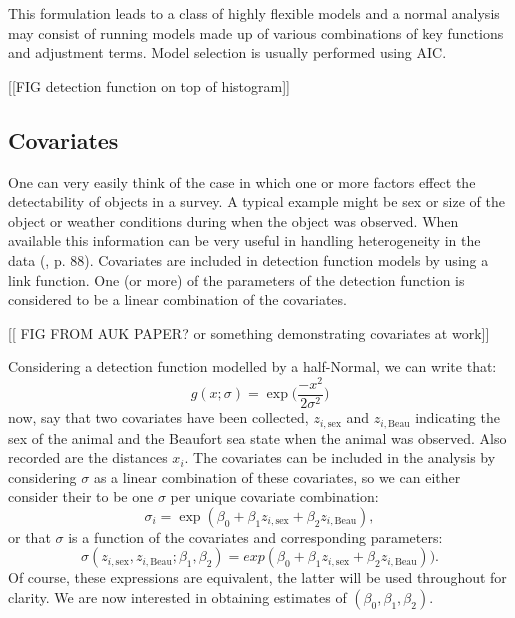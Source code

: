 This formulation leads to a class of highly flexible models and a normal analysis may consist of running models made up of various combinations of key functions and adjustment terms. Model selection is usually performed using AIC.

[[FIG detection function on top of histogram]]

\subsection{Covariates}
One can very easily think of the case in which one or more factors effect the detectability of objects in a survey. A typical example might be sex or size of the object or weather conditions during when the object was observed. When available this information can be very useful in handling heterogeneity in the data (\cite{IDS}, p. 88). Covariates are included in detection function models by using a link function. One (or more) of the parameters of the detection function is considered to be a linear combination of the covariates.

[[ FIG FROM AUK PAPER? or something demonstrating covariates at work]]

Considering a detection function modelled by a half-Normal, we can write that:
\begin{equation}
g(x; \sigma) = \exp\Big(\frac{-x^2}{2\sigma^2}\Big)
\end{equation}
now, say that two covariates have been collected, $z_{i,\text{sex}}$ and $z_{i,\text{Beau}}$ indicating the sex of the animal and the Beaufort sea state when the animal was observed. Also recorded are the distances $x_i$. The covariates can be included in the analysis by considering $\sigma$ as a linear combination of these covariates, so we can either consider their to be one $\sigma$ per unique covariate combination:
\begin{equation}
\sigma_i = \exp( \beta_0 + \beta_1 z_{i,\text{sex}} + \beta_2 z_{i,\text{Beau}}),
\end{equation}
or that $\sigma$ is a function of the covariates and corresponding parameters:
\begin{equation}
\sigma(z_{i,\text{sex}}, z_{i,\text{Beau}}; \beta_1, \beta_2) = exp(\beta_0 + \beta_1 z_{i,\text{sex}} + \beta_2 z_{i,\text{Beau}})).
\end{equation}
Of course, these expressions are equivalent, the latter will be used throughout for clarity. We are now interested in obtaining estimates of $(\beta_0, \beta_1, \beta_2)$.

